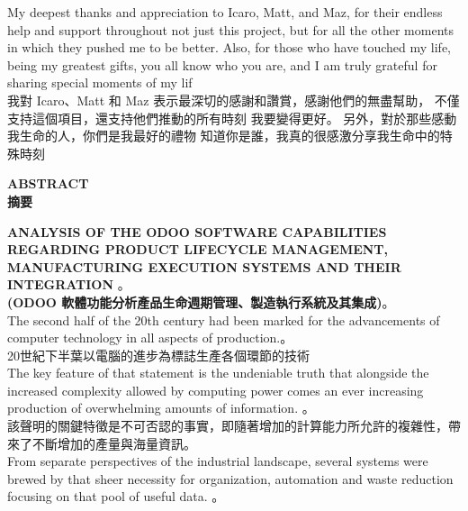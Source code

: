 \documentclass[12pt,a4paper]{report}  %
\begin{document}
\fontsize{14pt}{2.5pt}\sectionef
{  My deepest thanks and appreciation to Icaro, Matt, and Maz, for their endless help and 
support throughout not just this project, but for all the other moments in which they pushed 
me to be better. Also, for those who have touched my life, being my greatest gifts, you all 
know who you are, and I am truly grateful for sharing special moments of my lif}\\[1pt]

\fontsize{14pt}{5pt}\sectionef
  {我對 Icaro、Matt 和 Maz 表示最深切的感謝和讚賞，感謝他們的無盡幫助，
不僅支持這個項目，還支持他們推動的所有時刻
我要變得更好。 另外，對於那些感動我生命的人，你們是我最好的禮物
知道你是誰，我真的很感激分享我生命中的特殊時刻}\\[15pt]
\newpage
\begin{center}
 \fontsize{18}{16}\selectfont \textbf{ABSTRACT}\\
\fontsize{18}{16}\selectfont \textbf{摘要}\par

\end{center}
\fontsize{16}{18}\sectionef \textbf
 {ANALYSIS  OF  THE ODOO  SOFTWARE  CAPABILITIES  REGARDING  
 PRODUCT  LIFECYCLE  MANAGEMENT,  MANUFACTURING  EXECUTION 
 SYSTEMS  AND  THEIR  INTEGRATION }。\\[2pt]
\fontsize{16}{18}\sectionef \textbf
  {(ODOO 軟體功能分析產品生命週期管理、製造執行系統及其集成)}。\\[15pt]

\fontsize{14pt}{2.5pt}\sectionef 
{ The second half of the 20th century had been marked for the advancements of computer 
technology in all aspects of production.}。\\[1pt]

\fontsize{14pt}{5pt}\sectionef
 {20世紀下半葉以電腦的進步為標誌生產各個環節的技術}\\[15pt]

\fontsize{14pt}{2.5pt}\sectionef 
{ The key feature of that statement is the undeniable truth that alongside the increased 
complexity allowed by computing power comes an ever increasing production of 
overwhelming amounts of information. }。\\[1pt]

\fontsize{14pt}{5pt}\sectionef
 {該聲明的關鍵特徵是不可否認的事實，即隨著增加的計算能力所允許的複雜性，帶來了不斷增加的產量與海量資訊。}\\[15pt]

\fontsize{14pt}{2.5pt}\sectionef 
{From separate perspectives of the industrial landscape, several systems were brewed by 
that sheer necessity for organization, automation and waste reduction focusing on that pool 
of useful data. }。\\[1pt]
\end{document}
